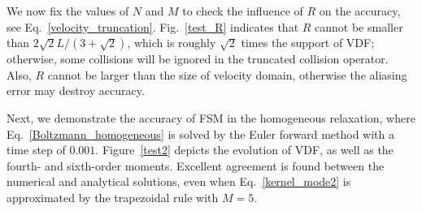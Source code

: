 We now fix the values of $N$ and $M$ to check the influence of $R$ on the accuracy, see Eq.~\eqref{velocity_truncation}. Fig.~\ref{test_R} indicates that $R$ cannot be smaller than $2\sqrt{2}L/(3+\sqrt{2})$, which is roughly $\sqrt{2}$ times the support of VDF; otherwise, some collisions will be ignored in the truncated collision operator. Also, $R$ cannot be larger than the size of velocity domain, otherwise the aliasing error may destroy accuracy.

%


Next, we demonstrate the accuracy of FSM in the homogeneous relaxation, where Eq.~\eqref{Boltzmann_homogeneous} is solved by the Euler forward method with a time step of $0.001$. Figure~\ref{test2} depicts the evolution of VDF, as well as the fourth- and sixth-order moments. Excellent agreement is found between the numerical and analytical solutions, even when Eq.~\eqref{kernel_mode2} is approximated by the trapezoidal rule with $M=5$. 


%


